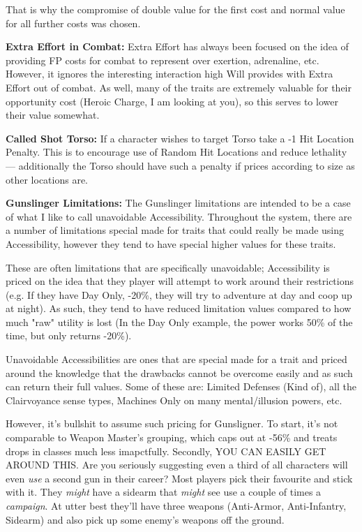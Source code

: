 \begin{multicols*}{2}
	That is why the compromise of double value for the first cost and normal value for all further costs was chosen. 
	
	\textbf{Extra Effort in Combat:} Extra Effort has always been focused on the idea of providing FP costs for combat to represent over exertion, adrenaline, etc. However, it ignores the interesting interaction high Will provides with Extra Effort out of combat. As well, many of the traits are extremely valuable for their opportunity cost (Heroic Charge, I am looking at you), so this serves to lower their value somewhat.
	
	\textbf{Called Shot Torso:} If a character wishes to target Torso take a -1 Hit Location Penalty. This is to encourage use of Random Hit Locations and reduce lethality — additionally the Torso should have such a penalty if prices according to size as other locations are.
	
	\textbf{Gunslinger Limitations:} The Gunslinger limitations are intended to be a case of what I like to call unavoidable Accessibility. Throughout the system, there are a number of limitations special made for traits that could really be made using Accessibility, however they tend to have special higher values for these traits. 
	
	These are often limitations that are specifically unavoidable; Accessibility is priced on the idea that they player will attempt to work around their restrictions (e.g. If they have Day Only, -20\%, they will try to adventure at day and coop up at night). As such, they tend to have reduced limitation values compared to how much "raw" utility is lost (In the Day Only example, the power works 50\% of the time, but only returns -20\%). 
	
	Unavoidable Accessibilities are ones that are special made for a trait and priced around the knowledge that the drawbacks cannot be overcome easily and as such can return their full values. Some of these are: Limited Defenses (Kind of), all the Clairvoyance sense types, Machines Only on many mental/illusion powers, etc. 
	
	However, it's bullshit to assume such pricing for Gunsligner. To start, it's not comparable to Weapon Master's grouping, which caps out at -56\% and treats drops in classes much less imapctfully. Secondly, YOU CAN EASILY GET AROUND THIS. Are you seriously suggesting even a third of all characters will even \textit{use} a second gun in their career? Most players pick their favourite and stick with it. They \textit{might} have a sidearm that \textit{might} see use a couple of times a \textit{campaign}. At utter best they'll have three weapons (Anti-Armor, Anti-Infantry, Sidearm) and also pick up some enemy's weapons off the ground.
	

\end{multicols*}
